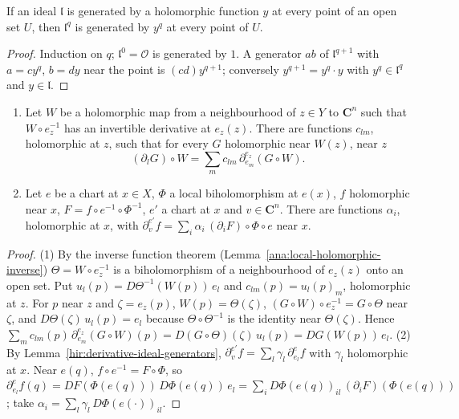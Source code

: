 \begin{lemma}
\label{mc:principal-power}
\leanok
If an ideal \(\mathfrak l\) is generated by a holomorphic function \(y\) at every point of an open set \(U\), then \(\mathfrak l^q\) is
generated by \(y^q\) at every point of \(U\).
\end{lemma}
\begin{proof}
\leanok
Induction on \(q\); \(\mathfrak l^0=\mathcal O\) is generated by \(1\). A generator \(ab\) of \(\mathfrak l^{q+1}\) with \(a=cy^q\), \(b=dy\) near
the point is \((cd)y^{q+1}\); conversely \(y^{q+1}=y^q\cdot y\) with \(y^q\in\mathfrak l^q\) and \(y\in\mathfrak l\).
\end{proof}

\begin{lemma}
\label{mc:coordinate-derivatives}
\leanok
\begin{enumerate}
\item Let \(W\) be a holomorphic map from a neighbourhood of \(z\in Y\) to \(\mathbf C^n\) such that \(W\circ e_z^{-1}\) has an invertible
derivative at \(e_z(z)\). There are functions \(c_{lm}\), holomorphic at \(z\), such that for every \(G\) holomorphic near \(W(z)\), near \(z\)
\[
 (\partial_lG)\circ W=\sum_mc_{lm}\,\partial^{e_z}_{e_m}(G\circ W).
\]
\item Let \(e\) be a chart at \(x\in X\), \(\Phi\) a local biholomorphism at \(e(x)\), \(f\) holomorphic near \(x\), \(F=f\circ e^{-1}\circ\Phi^{-1}\),
\(e'\) a chart at \(x\) and \(v\in\mathbf C^n\). There are functions \(\alpha_i\), holomorphic at \(x\), with
\(\partial^{e'}_vf=\sum_i\alpha_i\,(\partial_iF)\circ\Phi\circ e\) near \(x\).
\end{enumerate}
\end{lemma}
\begin{proof}
\leanok
(1) By the inverse function theorem (Lemma~\ref{ana:local-holomorphic-inverse}) \(\Theta=W\circ e_z^{-1}\) is a biholomorphism of a
neighbourhood of \(e_z(z)\) onto an open set. Put \(u_l(p)=D\Theta^{-1}(W(p))\,e_l\) and \(c_{lm}(p)=u_l(p)_m\), holomorphic at \(z\). For \(p\) near
\(z\) and \(\zeta=e_z(p)\), \(W(p)=\Theta(\zeta)\), \((G\circ W)\circ e_z^{-1}=G\circ\Theta\) near \(\zeta\), and \(D\Theta(\zeta)\,u_l(p)=e_l\) because
\(\Theta\circ\Theta^{-1}\) is the identity near \(\Theta(\zeta)\). Hence
\(\sum_mc_{lm}(p)\,\partial^{e_z}_{e_m}(G\circ W)(p)=D(G\circ\Theta)(\zeta)\,u_l(p)=DG(W(p))\,e_l\).
(2) By Lemma~\ref{hir:derivative-ideal-generators}, \(\partial^{e'}_vf=\sum_l\gamma_l\,\partial^e_{e_l}f\) with \(\gamma_l\) holomorphic at \(x\). Near
\(e(q)\), \(f\circ e^{-1}=F\circ\Phi\), so \(\partial^e_{e_l}f(q)=DF(\Phi(e(q)))\,D\Phi(e(q))\,e_l=\sum_iD\Phi(e(q))_{il}\,(\partial_iF)(\Phi(e(q)))\); take
\(\alpha_i=\sum_l\gamma_l\,D\Phi(e(\cdot))_{il}\).
\end{proof}

